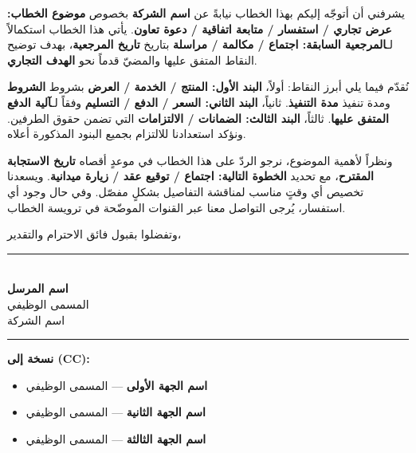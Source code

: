 \documentclass[12pt,a4paper]{article}
\begin{document}
يشرفني أن أتوجّه إليكم بهذا الخطاب نيابةً عن \textbf{اسم الشركة} بخصوص \textbf{موضوع الخطاب: عرض تجاري / استفسار / متابعة اتفاقية / دعوة تعاون}. يأتي هذا الخطاب استكمالاً لـ\textbf{المرجعية السابقة: اجتماع / مكالمة / مراسلة} بتاريخ \textbf{تاريخ المرجعية}، بهدف توضيح النقاط المتفق عليها والمضيّ قدماً نحو \textbf{الهدف التجاري}.

نُقدّم فيما يلي أبرز النقاط: أولاً، \textbf{البند الأول: المنتج / الخدمة / العرض} بشروط \textbf{الشروط} ومدة تنفيذ \textbf{مدة التنفيذ}. ثانياً، \textbf{البند الثاني: السعر / الدفع / التسليم} وفقاً لـ\textbf{آلية الدفع المتفق عليها}. ثالثاً، \textbf{البند الثالث: الضمانات / الالتزامات} التي تضمن حقوق الطرفين. ونؤكد استعدادنا للالتزام بجميع البنود المذكورة أعلاه.

ونظراً لأهمية الموضوع، نرجو الردّ على هذا الخطاب في موعدٍ أقصاه \textbf{تاريخ الاستجابة المقترح}، مع تحديد \textbf{الخطوة التالية: اجتماع / توقيع عقد / زيارة ميدانية}. ويسعدنا تخصيص أي وقتٍ مناسب لمناقشة التفاصيل بشكلٍ مفصّل. وفي حال وجود أي استفسار، يُرجى التواصل معنا عبر القنوات الموضّحة في ترويسة الخطاب.

\vspace{0.5em}
\begin{flushright}
وتفضلوا بقبول فائق الاحترام والتقدير،
\end{flushright}

\vspace{2em}

\begin{flushright}
\rule{5cm}{0.4pt}\\[0.3em]
\textbf{اسم المرسل}\\[0.2em]
المسمى الوظيفي\\[0.2em]
اسم الشركة
\end{flushright}

\vspace{1.5em}
\hrule
\vspace{1em}

\begin{flushright}
\textbf{نسخة إلى (CC):}\\[0.2em]
\begin{itemize}[leftmargin=2em,rightmargin=0pt,nosep,itemsep=0.2em]
  \item \textbf{اسم الجهة الأولى} --- المسمى الوظيفي
  \item \textbf{اسم الجهة الثانية} --- المسمى الوظيفي
  \item \textbf{اسم الجهة الثالثة} --- المسمى الوظيفي
\end{itemize}
\end{flushright}
\end{document}
